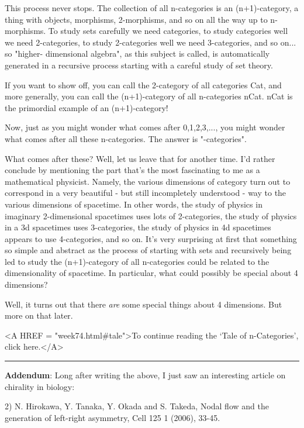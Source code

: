 This process never stops.   The collection of all n-categories is an
(n+1)-category, a thing with objects, morphisms, 2-morphisms, and so on
all the way up to n-morphisms.  To study sets carefully we need
categories, to study categories well we need 2-categories, to study
2-categories well we need 3-categories, and so on... so "higher-
dimensional algebra", as this subject is called, is automatically
generated in a recursive process starting with a careful study of set
theory.


 If you want to show off, you can call the 2-category of all
categories Cat, and more generally, you can call the (n+1)-category
of all n-categories nCat.   nCat is the primordial example of an 
(n+1)-category!

Now, just as you might wonder what comes after 0,1,2,3,..., you might
wonder what comes after all these n-categories.  The answer is
"\omega -categories".  

What comes after these?  Well, let us leave that for another time.  I'd
rather conclude by mentioning the part that's the most fascinating to me
as a mathematical physicist.  Namely, the various dimensions of category
turn out to correspond in a very beautiful - but still incompletely
understood - way to the various dimensions of spacetime.  In other
words, the study of physics in imaginary 2-dimensional spacetimes uses
lots of 2-categories, the study of physics in a 3d spacetimes uses
3-categories, the study of physics in 4d spacetimes appears to use
4-categories, and so on.  It's very surprising at first that something
so simple and abstract as the process of starting with sets and
recursively being led to study the (n+1)-category of all n-categories
could be related to the dimensionality of spacetime.  In particular,
what could possibly be special about 4 dimensions?  

Well, it turns out that there \emph{are} some special things about 4
dimensions.  But more on that later.

<A HREF = "week74.html#tale">To continue reading the `Tale of
n-Categories', click here.</A>


\par\noindent\rule{\textwidth}{0.4pt}

\textbf{Addendum}: 
Long after writing the above, I just saw an interesting article 
on chirality in biology:

2) N. Hirokawa, Y. Tanaka, Y. Okada and S. Takeda, Nodal flow and the
generation of left-right asymmetry, Cell 125 1 (2006), 33-45.

